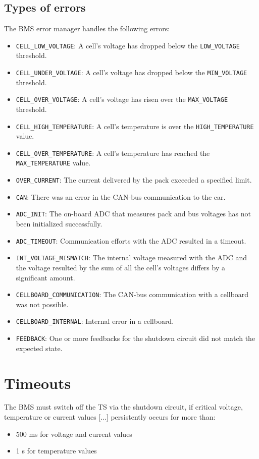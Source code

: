 \subsection{Types of errors}
The BMS error manager handles the following errors:
\begin{itemize}
	\item \texttt{CELL\_LOW\_VOLTAGE}: A cell's voltage has dropped below the \texttt{LOW\_VOLTAGE} threshold.
	\item \texttt{CELL\_UNDER\_VOLTAGE}: A cell's voltage has dropped below the \texttt{MIN\_VOLTAGE} threshold.
	\item \texttt{CELL\_OVER\_VOLTAGE}: A cell's voltage has risen over the \texttt{MAX\_VOLTAGE} threshold.
	\item \texttt{CELL\_HIGH\_TEMPERATURE}: A cell's temperature is over the \texttt{HIGH\_TEMPERATURE} value.
	\item \texttt{CELL\_OVER\_TEMPERATURE}: A cell's temperature has reached the \texttt{MAX\_TEMPERATURE} value.
	\item \texttt{OVER\_CURRENT}: The current delivered by the pack exceeded a specified limit.
	\item \texttt{CAN}: There was an error in the CAN-bus communication to the car.
	\item \texttt{ADC\_INIT}: The on-board ADC that measures pack and bus voltages has not been initialized successfully.
	\item \texttt{ADC\_TIMEOUT}: Communication efforts with the ADC resulted in a timeout.
	\item \texttt{INT\_VOLTAGE\_MISMATCH}: The internal voltage measured with the ADC and the voltage resulted by the sum of all the cell's voltages differs by a significant amount.
	\item \texttt{CELLBOARD\_COMMUNICATION}: The CAN-bus communication with a cellboard was not possible.
	\item \texttt{CELLBOARD\_INTERNAL}: Internal error in a cellboard.
	\item \texttt{FEEDBACK}: One or more feedbacks for the shutdown circuit did not match the expected state.
\end{itemize}

\section{Timeouts}

\begin{displayquote}
	The BMS must switch off the TS via the shutdown circuit, if critical voltage, temperature
	or current values [...] persistently occurs for more than:
	\begin{itemize}
		\item 500 ms for voltage and current values
		\item 1 s for temperature values
	\end{itemize}
	\label{quote:586}
\end{displayquote}

